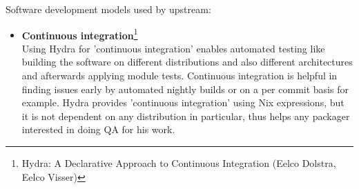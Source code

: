 \documentclass[a4paper,10pt]{article}
\begin{document}
Software development models used by upstream:
\begin{itemize}
\item \textbf{Continuous integration}\footnote{Hydra: A Declarative Approach to Continuous Integration (Eelco Dolstra, Eelco Visser)}\\
Using Hydra for 'continuous integration' enables automated testing like building the software on different distributions and also different architectures and afterwards applying module tests. Continuous integration is helpful in finding issues early by automated nightly builds or on a per commit basis for example. Hydra provides 'continuous integration' using Nix expressions, but it is not dependent on any distribution in particular, thus helps any packager interested in doing QA for his work.
\end{itemize}
\end{document}

